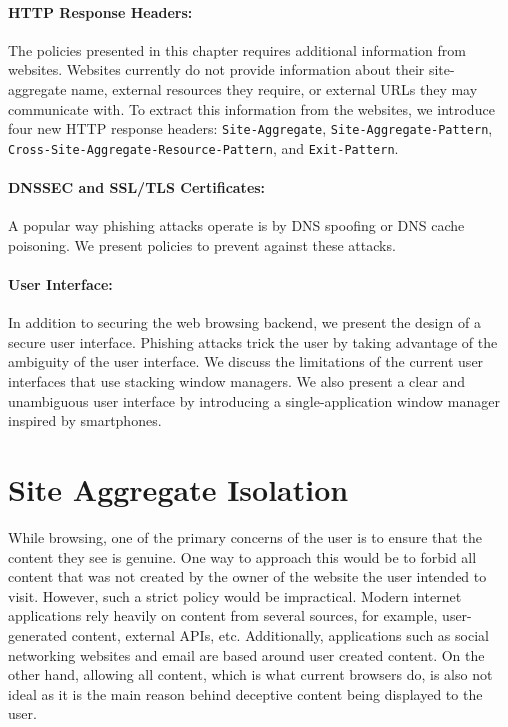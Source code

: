 \paragraph{HTTP Response Headers:} The policies presented in this chapter requires additional information from websites. Websites currently do not provide information about their site-aggregate name, external resources they require, or external URLs they may communicate with. To extract this information from the websites, we introduce four new HTTP response headers: \texttt{Site-Aggregate},  \texttt{Site-Aggregate-Pattern}, \texttt{Cross-Site-Aggregate-Resource-Pattern}, and \texttt{Exit-Pattern}.

\paragraph{DNSSEC and SSL/TLS Certificates:} A popular way phishing attacks operate is by DNS spoofing or DNS cache poisoning. We present policies to prevent against these attacks.

\paragraph{User Interface:} In addition to securing the web browsing backend, we present the design of a secure user interface. Phishing attacks trick the user by taking advantage of the ambiguity of the user interface. We discuss the limitations of the current user interfaces that use stacking window managers. We also present a clear and unambiguous user interface by introducing a single-application window manager inspired by smartphones.

\section{Site Aggregate Isolation} \label{same_origin_isolation}

While browsing, one of the primary concerns of the user is to ensure that the content they see is genuine. One way to approach this would be to forbid all content that was not created by the owner of the website the user intended to visit. However, such a strict policy would be impractical. Modern internet applications rely heavily on content from several sources, for example, user-generated content, external APIs, etc. Additionally, applications such as social networking websites and email are based around user created content. On the other hand, allowing all content, which is what current browsers do, is also not ideal as it is the main reason behind deceptive content being displayed to the user.

